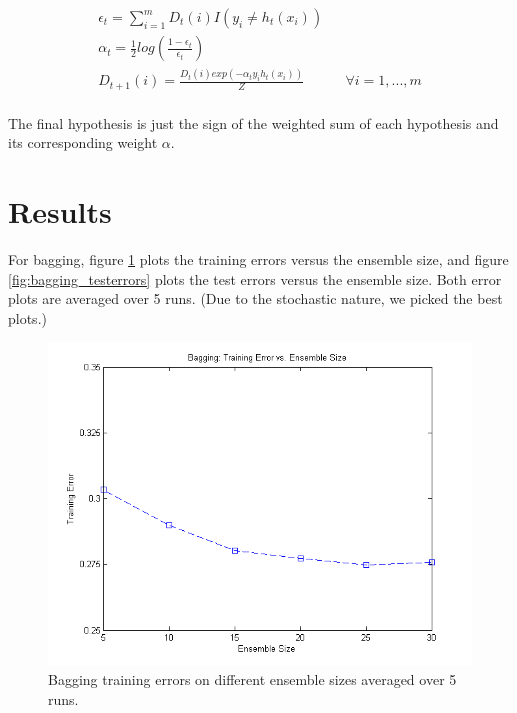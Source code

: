 \documentclass[12pt]{article}
\begin{document}
\begin{align}
 \epsilon_t = \sum_{i=1}^{m} D_t(i) I(y_i \neq h_t(x_i)) \\
 \alpha_t = \frac{1}{2} log\left(\frac{1-\epsilon_t}{\epsilon_t}\right) \\
 D_{t+1}(i) = \frac{ D_{t}(i)exp(-\alpha_t y_i h_t(x_i)) }{Z} & & \forall i = 1,...,m \\
\end{align}

The final hypothesis is just the sign of the weighted sum of each hypothesis and its corresponding weight \(\alpha\).

\section{Results}
For bagging, figure \ref{fig:bagging_trainerrors} plots the training errors versus the ensemble size, and figure \ref{fig:bagging_testerrors} plots the test errors versus the ensemble size. Both error plots are averaged over 5 runs. (Due to the stochastic nature, we picked the best plots.)

\begin{figure}[!t]
  \centering
  \includegraphics[scale=.6]{img/bagging_trainerrors.png}
  \caption{Bagging training errors on different ensemble sizes averaged over 5 runs.}
  \label{fig:bagging_trainerrors}
\end{figure}
\end{document}
